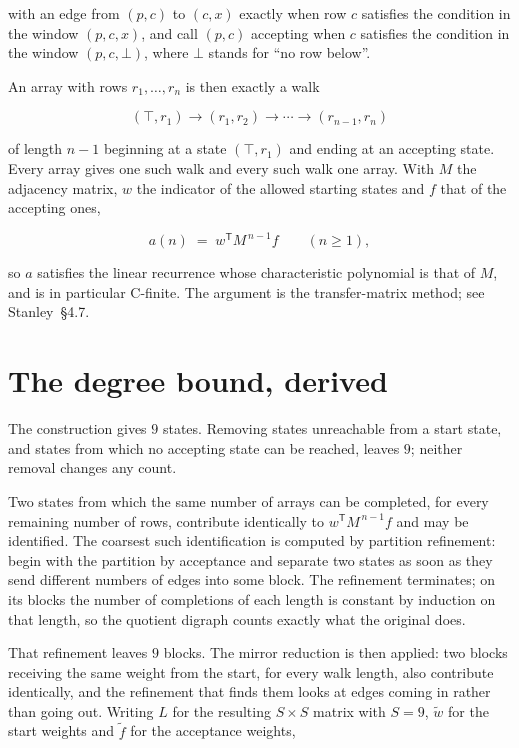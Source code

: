 \documentclass[11pt]{article}
\theoremstyle{definition}
\begin{document}
with an edge from $(p,c)$ to $(c,x)$ exactly when row $c$ satisfies the condition in the window $(p,c,x)$, and call $(p,c)$ accepting when $c$ satisfies the condition in the window $(p,c,\bot)$, where $\bot$ stands for ``no row below''.

An array with rows $r_1,\dots,r_n$ is then exactly a walk

\[(\top,r_1) \to (r_1,r_2) \to \cdots \to (r_{n-1},r_n)\]

of length $n-1$ beginning at a state $(\top,r_1)$ and ending at an accepting state. Every array gives one such walk and every such walk one array. With $M$ the adjacency matrix, $w$ the indicator of the allowed starting states and $f$ that of the accepting ones,

\[a(n) \;=\; w^{\mathsf T} M^{\,n-1} f \qquad (n \ge 1),\]

so $a$ satisfies the linear recurrence whose characteristic polynomial is that of $M$, and is in particular C-finite. The argument is the transfer-matrix method; see Stanley~\S4.7.

\section{The degree bound, derived}

The construction gives $9$ states. Removing states unreachable from a start state, and states from which no accepting state can be reached, leaves $9$; neither removal changes any count.

Two states from which the same number of arrays can be completed, for every remaining number of rows, contribute identically to $w^{\mathsf T}M^{\,n-1}f$ and may be identified. The coarsest such identification is computed by partition refinement: begin with the partition by acceptance and separate two states as soon as they send different numbers of edges into some block. The refinement terminates; on its blocks the number of completions of each length is constant by induction on that length, so the quotient digraph counts exactly what the original does.

That refinement leaves $9$ blocks. The mirror reduction is then applied: two blocks receiving the same weight from the start, for every walk length, also contribute identically, and the refinement that finds them looks at edges coming in rather than going out. Writing $L$ for the resulting $S \times S$ matrix with $S = 9$, $\tilde w$ for the start weights and $\tilde f$ for the acceptance weights,
\end{document}
